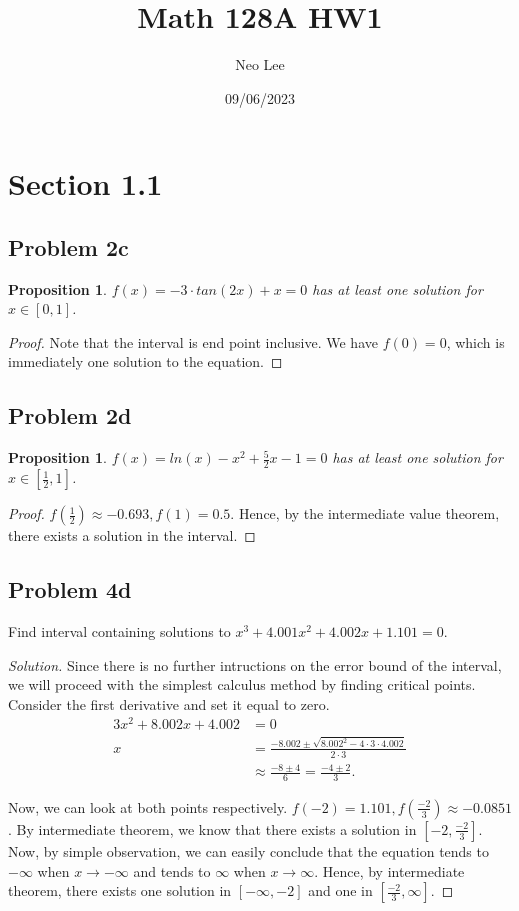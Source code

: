 \documentclass{article}
\title{Math 128A HW1}
\author{Neo Lee}
\date{09/06/2023}
\newtheorem{proposition}[thm]{Proposition}
\begin{document}
 

\maketitle 

\section*{Section 1.1}
\subsection*{Problem 2c}
\begin{proposition}
    $f(x) = -3\cdot tan(2x) + x = 0$ has at least one solution for $x \in [0,1]$.
\end{proposition}
\begin{proof}
    Note that the interval is end point inclusive. 
    We have $f(0) = 0$, which is immediately one solution to the equation.
\end{proof}

\subsection*{Problem 2d}
\begin{proposition}
    $f(x) = ln(x)-x^2+\frac{5}{2}x - 1 = 0$ has at least one solution for $x \in [\frac{1}{2},1]$.
\end{proposition}
\begin{proof}
    $f(\frac{1}{2}) \approx -0.693, f(1) = 0.5$. Hence, by the intermediate value theorem, there 
    exists a solution in the interval.
\end{proof}

\subsection*{Problem 4d}
Find interval containing solutions to $x^3 + 4.001x^2 + 4.002x + 1.101 = 0$.
\begin{proof}[Solution]
    Since there is no further intructions on the error bound of the interval, we will proceed with 
    the simplest calculus method by finding critical points. Consider the first derivative and set 
    it equal to zero.
    \begin{align*}
        3x^2 + 8.002x + 4.002 & = 0 \\
        x & = \frac{-8.002 \pm \sqrt{8.002^2 - 4\cdot 3\cdot 4.002}}{2\cdot 3} \\
        & \approx \frac{-8 \pm 4}{6} = \frac{-4 \pm 2}{3}.
    \end{align*}

    Now, we can look at both points respectively. $f(-2) = 1.101, f(\frac{-2}{3}) \approx -0.0851$.
    By intermediate theorem, we know that there exists a solution in $[-2, \frac{-2}{3}]$. Now, by 
    simple observation, we can easily conclude that the equation tends to $-\infty$ when $x 
    \rightarrow -\infty$ and tends to $\infty$ when $x \rightarrow \infty$. Hence, by intermediate 
    theorem, there exists one solution in $[-\infty, -2]$ and one in $[\frac{-2}{3}, \infty]$.
\end{proof}
\end{document}
